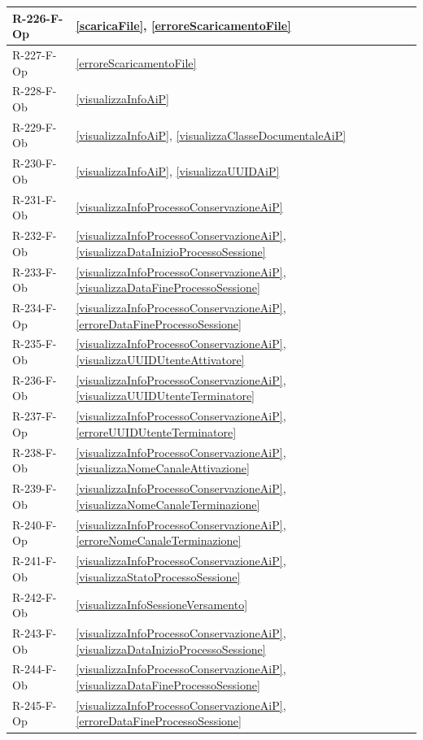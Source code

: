 \begin{longtable}{|p{4cm}|p{10cm}|}
R-226-F-Op & \ref{scaricaFile}, \ref{erroreScaricamentoFile} \\
\hline
R-227-F-Op & \ref{erroreScaricamentoFile} \\
\hline
R-228-F-Ob & \ref{visualizzaInfoAiP} \\
\hline
R-229-F-Ob & \ref{visualizzaInfoAiP}, \ref{visualizzaClasseDocumentaleAiP} \\
\hline
R-230-F-Ob & \ref{visualizzaInfoAiP}, \ref{visualizzaUUIDAiP} \\
\hline
R-231-F-Ob & \ref{visualizzaInfoProcessoConservazioneAiP} \\
\hline
R-232-F-Ob & \ref{visualizzaInfoProcessoConservazioneAiP}, \ref{visualizzaDataInizioProcessoSessione} \\
\hline
R-233-F-Ob & \ref{visualizzaInfoProcessoConservazioneAiP}, \ref{visualizzaDataFineProcessoSessione} \\
\hline
R-234-F-Op & \ref{visualizzaInfoProcessoConservazioneAiP}, \ref{erroreDataFineProcessoSessione} \\
\hline
R-235-F-Ob & \ref{visualizzaInfoProcessoConservazioneAiP}, \ref{visualizzaUUIDUtenteAttivatore} \\
\hline
R-236-F-Ob & \ref{visualizzaInfoProcessoConservazioneAiP}, \ref{visualizzaUUIDUtenteTerminatore} \\
\hline
R-237-F-Op & \ref{visualizzaInfoProcessoConservazioneAiP}, \ref{erroreUUIDUtenteTerminatore} \\
\hline
R-238-F-Ob & \ref{visualizzaInfoProcessoConservazioneAiP}, \ref{visualizzaNomeCanaleAttivazione} \\
\hline
R-239-F-Ob & \ref{visualizzaInfoProcessoConservazioneAiP}, \ref{visualizzaNomeCanaleTerminazione} \\
\hline
R-240-F-Op & \ref{visualizzaInfoProcessoConservazioneAiP}, \ref{erroreNomeCanaleTerminazione} \\
\hline
R-241-F-Ob & \ref{visualizzaInfoProcessoConservazioneAiP}, \ref{visualizzaStatoProcessoSessione} \\
\hline
R-242-F-Ob & \ref{visualizzaInfoSessioneVersamento} \\
\hline
R-243-F-Ob & \ref{visualizzaInfoProcessoConservazioneAiP}, \ref{visualizzaDataInizioProcessoSessione} \\
\hline
R-244-F-Ob & \ref{visualizzaInfoProcessoConservazioneAiP}, \ref{visualizzaDataFineProcessoSessione} \\
\hline
R-245-F-Op & \ref{visualizzaInfoProcessoConservazioneAiP}, \ref{erroreDataFineProcessoSessione} \\

\end{longtable}
